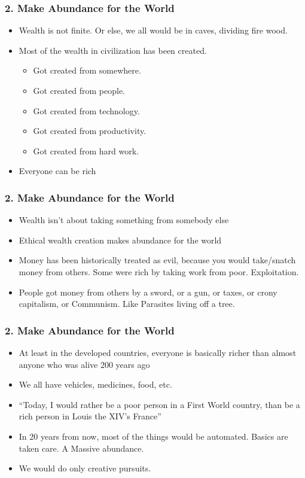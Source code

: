 \begin{frame}[fragile]
\frametitle{2. Make Abundance for the World}
\begin{itemize}
\item Wealth is not finite. Or else, we all would be in caves, dividing fire wood.
\item Most of the wealth in civilization has been created.
\begin{itemize}
\item Got created from somewhere. 
\item Got created from people. 
\item Got created from technology. 
\item Got created from productivity. 
\item Got created from hard work.
\end{itemize}
\item Everyone can be rich
\end{itemize}
\end{frame}

\begin{frame}[fragile]
\frametitle{2. Make Abundance for the World}
\begin{itemize}
\item Wealth isn't about taking something from somebody else
\item Ethical wealth creation makes abundance for the world
\item Money has been historically treated as evil, because you would take/snatch money from others. Some were rich by taking work from poor. Exploitation. 
\item People got money from others by a sword, or a gun, or taxes, or crony capitalism, or Communism. Like Parasites living off a tree.
\end{itemize}
\end{frame}

\begin{frame}[fragile]
\frametitle{2. Make Abundance for the World}
\begin{itemize}
\item At least in the developed countries, everyone is basically richer than almost anyone who was alive 200 years ago
\item We all have vehicles, medicines, food, etc.
\item ``Today, I would rather be a poor person in a First World country, than be a rich person in Louis the XIV's France''
\item In 20 years from now, most of the things would be automated. Basics are taken care. A Massive abundance.
\item We would do only creative pursuits.
\end{itemize}
\end{frame}


